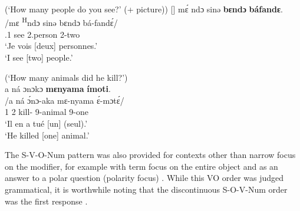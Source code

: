 \documentclass[output=paper,colorlinks,citecolor=brown
]{langscibook}
\begin{document}
\ea \label{subDPvoset} (`How many people do you see?' (+ picture))
\ea
[]{
\label{subDPvo}
\glll
{\db}mɛ́ ndɔ sinə \textbf{bɛndɔ} \textbf{báfandɛ}. \\
/mɛ \textsuperscript{H}ndɔ sinə bɛndɔ bá-fandɛ́/ \\
{\db}\SM{}.1\SG{} \PRS{} see 2.person 2-two \\
\glt
`Je vois [deux]\textsubscript{\FOC{}} personnes.' \\ `I see [two]\textsubscript{\FOC{}} people.' \jambox*{[JO 541] }
}


\z
\z

\ea
\label{animalkill}
(`How many animals did he kill?') \\ 
\glll
{\db}a ná ɔnɔkɔ \textbf{mɛnyama} \textbf{ímoti}. \\
/a ná ɔ́nɔ-aka mɛ-nyama ɛ́-mɔtɛ́/ \\
{\db}1\SM{} \PST{}2{} kill-\DUR{} 9-animal 9-one \\
\glt
`Il en a tué [un]\textsubscript{\FOC{}} (seul).' \\ `He killed [one]\textsubscript{\FOC{}} animal.' \jambox*{[EO 1416] }

\z


The S-V-O-Num pattern was also provided for contexts other than narrow focus on the modifier, for example with term focus on the entire object  and as an answer to a polar question (polarity focus) . While this VO order was judged grammatical, it is worthwhile noting that the discontinuous S-O-V-Num order was the first response .
\end{document}
